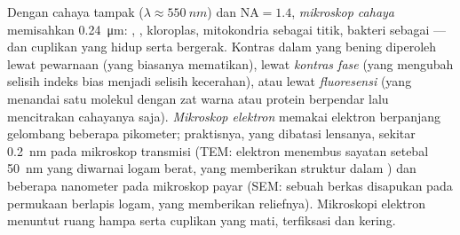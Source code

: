 \begin{proposition}\label{prop:b1:cell-unit-of-life:microscopes}
Dengan cahaya tampak ($\lambda \approx \qty{550}{nm}$) dan
$\mathrm{NA} = 1.4$, \emph{mikroskop cahaya}
memisahkan \qty{0.24}{\micro m}: , , kloroplas, mitokondria
sebagai titik, bakteri sebagai  --- dan cuplikan yang hidup serta
bergerak. Kontras dalam  yang bening diperoleh lewat pewarnaan (yang
biasanya mematikan), lewat \emph{kontras fase} (yang mengubah selisih indeks
bias menjadi selisih kecerahan), atau lewat \emph{fluoresensi} (yang
menandai satu molekul dengan zat warna atau protein berpendar lalu
mencitrakan cahayanya saja). \emph{Mikroskop elektron}
memakai elektron berpanjang gelombang beberapa pikometer; 
praktisnya, yang dibatasi lensanya, sekitar \qty{0.2}{nm} pada mikroskop
transmisi (TEM: elektron menembus sayatan setebal \qty{50}{nm} yang
diwarnai logam berat, yang memberikan struktur dalam ) dan
beberapa nanometer pada mikroskop payar (SEM: sebuah berkas disapukan
pada permukaan berlapis logam, yang memberikan reliefnya). Mikroskopi
elektron menuntut ruang hampa serta cuplikan yang mati, terfiksasi dan
kering.
\end{proposition}


